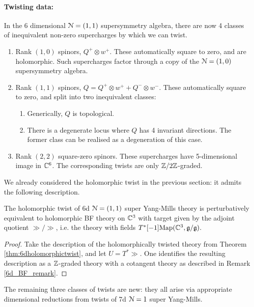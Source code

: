\documentclass[10pt, oneside]{article}
\begin{document}
\paragraph{Twisting data:}
In the 6 dimensional $\mathcal{N}=(1,1)$ supersymmetry algebra, there are now 4 classes of inequivalent non-zero supercharges by which we can twist.
\begin{enumerate}
 \item Rank $(1,0)$ spinors, $Q^+ \otimes w^+$.  These automatically square to zero, and are holomorphic.  Such supercharges factor through a copy of the $\mathcal{N}=(1,0)$ supersymmetry algebra.
 \item Rank $(1,1)$ spinors, $Q = Q^+ \otimes w^+ + Q^- \otimes w^-$.  These automatically square to zero, and split into two inequivalent classes:
 \begin{enumerate}
 \item Generically, $Q$ is topological.
 \item There is a degenerate locus where $Q$ has 4 invariant directions.  The former class can be realised as a degeneration of this case.
 \end{enumerate}
 \item Rank $(2,2)$ square-zero spinors.  These supercharges have 5-dimensional image in $\mathbb C^6$.  The corresponding twists are only $\mathbb Z/2\mathbb Z$-graded.
\end{enumerate}

We already considered the holomorphic twist in the previous section: it admits the following description.

\begin{theorem} \label{6d_holo_twist_thm}
The holomorphic twist of 6d $\mathcal{N}=(1,1)$ super Yang-Mills theory is perturbatively equivalent to holomorphic BF theory on $\mathbb C^3$ with target given by the adjoint quotient $\gg/\gg$, i.e. the theory with fields $T^*[-1]\mathrm{Map}(\mathbb C^3, \mathfrak{g}/\mathfrak{g})$.
\end{theorem}

\begin{proof}
Take the description of the holomorphically twisted theory from Theorem \ref{thm:6dholomorphictwist}, and let $U = T^*\gg$.  One identifies the resulting description as a $\mathbb Z$-graded theory with a cotangent theory as described in Remark \ref{6d_BF_remark}.
\end{proof}

The remaining three classes of twists are new: they all arise via appropriate dimensional reductions from twists of 7d $\mathcal{N}=1$ super Yang-Mills.
\end{document}
